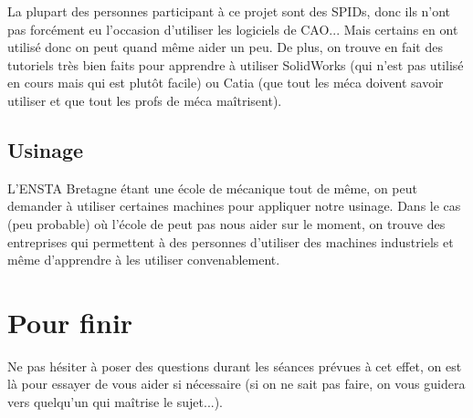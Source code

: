 \documentclass[fleqn,10pt]{SelfArx} %
\begin{document}
La plupart des personnes participant à ce projet sont des SPIDs, donc ils n'ont pas forcément eu l'occasion d'utiliser les logiciels de CAO... Mais certains en ont utilisé donc on peut quand même aider un peu. De plus, on trouve en fait des tutoriels très bien faits pour apprendre à utiliser SolidWorks (qui n'est pas utilisé en cours mais qui est plutôt facile) ou Catia (que tout les méca doivent savoir utiliser et que tout les profs de méca maîtrisent).

\subsection{Usinage}

L'ENSTA Bretagne étant une école de mécanique tout de même, on peut demander à utiliser certaines machines pour appliquer notre usinage. Dans le cas (peu probable) où l'école de peut pas nous aider sur le moment, on trouve des entreprises qui permettent à des personnes d'utiliser des machines industriels et même d'apprendre à les utiliser convenablement.


\section*{Pour finir} %


Ne pas hésiter à poser des questions durant les séances prévues à cet effet, on est là pour essayer de vous aider si nécessaire (si on ne sait pas faire, on vous guidera vers quelqu'un qui maîtrise le sujet...).


\end{document}
